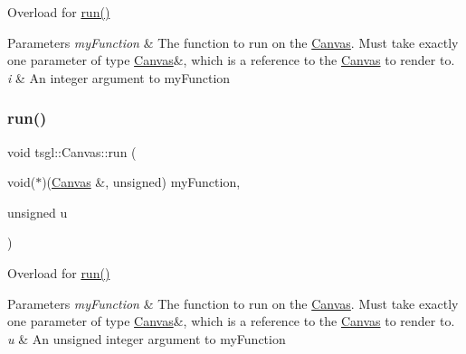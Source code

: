 Overload for \hyperlink{classtsgl_1_1_canvas_a5f3f00d6c380a662a239077456045502}{run()} 


\begin{DoxyParams}{Parameters}
{\em my\+Function} & The function to run on the \hyperlink{classtsgl_1_1_canvas}{Canvas}. Must take exactly one parameter of type \hyperlink{classtsgl_1_1_canvas}{Canvas}\&, which is a reference to the \hyperlink{classtsgl_1_1_canvas}{Canvas} to render to. \\
\hline
{\em i} & An integer argument to my\+Function \\
\hline
\end{DoxyParams}
\mbox{\label{classtsgl_1_1_canvas_a67b341ead1fde0a692281d2b1f67be1e}} 
\subsubsection{\texorpdfstring{run()}{run()}\hspace{0.1cm}{\footnotesize\ttfamily [3/10]}}
{\footnotesize\ttfamily void tsgl\+::\+Canvas\+::run (\begin{DoxyParamCaption}\item[{void($\ast$)(\hyperlink{classtsgl_1_1_canvas}{Canvas} \&, unsigned)}]{my\+Function,  }\item[{unsigned}]{u }\end{DoxyParamCaption})\hspace{0.3cm}{\ttfamily [virtual]}}



Overload for \hyperlink{classtsgl_1_1_canvas_a5f3f00d6c380a662a239077456045502}{run()} 


\begin{DoxyParams}{Parameters}
{\em my\+Function} & The function to run on the \hyperlink{classtsgl_1_1_canvas}{Canvas}. Must take exactly one parameter of type \hyperlink{classtsgl_1_1_canvas}{Canvas}\&, which is a reference to the \hyperlink{classtsgl_1_1_canvas}{Canvas} to render to. \\
\hline
{\em u} & An unsigned integer argument to my\+Function \\
\hline
\end{DoxyParams}
\mbox{\label{classtsgl_1_1_canvas_a768c10737f9590a25d8e66dcc7137d9b}} 
